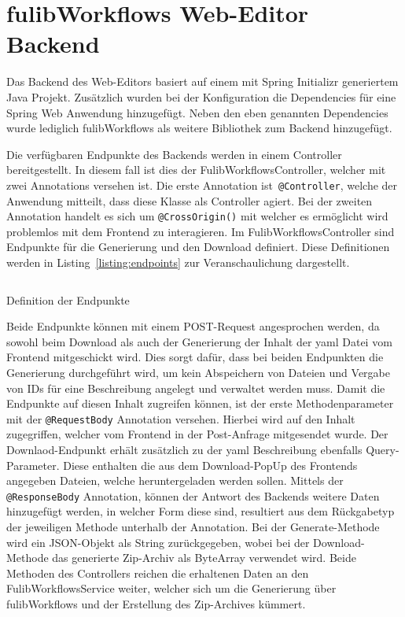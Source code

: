 \section{fulibWorkflows Web-Editor Backend}\label{sec:editor-backend}
Das Backend des Web-Editors basiert auf einem mit Spring Initializr generiertem Java Projekt.
Zusätzlich wurden bei der Konfiguration die Dependencies für eine Spring Web Anwendung hinzugefügt.
Neben den eben genannten Dependencies wurde lediglich fulibWorkflows als weitere Bibliothek zum Backend hinzugefügt.

Die verfügbaren Endpunkte des Backends werden in einem Controller bereitgestellt.
In diesem fall ist dies der FulibWorkflowsController, welcher mit zwei Annotations versehen ist.
Die erste Annotation ist~\texttt{@Controller}, welche der Anwendung mitteilt, dass diese Klasse als Controller agiert.
Bei der zweiten Annotation handelt es sich um \texttt{@CrossOrigin()} mit welcher es ermöglicht wird problemlos mit dem
Frontend zu interagieren.
Im FulibWorkflowsController sind Endpunkte für die Generierung und den Download definiert.
Diese Definitionen werden in Listing~\ref{listing:endpoints} zur Veranschaulichung dargestellt.

\begin{listing}[!ht]
    \inputminted[xleftmargin=20pt,linenos,firstnumber=15]{java}{listings/3.3/Endpoints.java}
    \caption{Definition der Endpunkte}
    \label{listing:endpoints}
\end{listing}

Beide Endpunkte können mit einem POST-Request angesprochen werden, da sowohl beim Download als auch der Generierung der Inhalt der
yaml Datei vom Frontend mitgeschickt wird.
Dies sorgt dafür, dass bei beiden Endpunkten die Generierung durchgeführt wird, um kein Abspeichern von Dateien und Vergabe von IDs für
eine Beschreibung angelegt und verwaltet werden muss.
Damit die Endpunkte auf diesen Inhalt zugreifen können, ist der erste Methodenparameter mit der \texttt{@RequestBody} Annotation versehen.
Hierbei wird auf den Inhalt zugegriffen, welcher vom Frontend in der Post-Anfrage mitgesendet wurde.
Der Downlaod-Endpunkt erhält zusätzlich zu der yaml Beschreibung ebenfalls Query-Parameter.
Diese enthalten die aus dem Download-PopUp des Frontends angegeben Dateien, welche heruntergeladen werden sollen.
Mittels der \texttt{@ResponseBody} Annotation, können der Antwort des Backends weitere Daten hinzugefügt werden, in welcher Form diese
sind, resultiert aus dem Rückgabetyp der jeweiligen Methode unterhalb der Annotation.
Bei der Generate-Methode wird ein JSON-Objekt als String zurückgegeben, wobei bei der Download-Methode das generierte Zip-Archiv als ByteArray verwendet wird.
Beide Methoden des Controllers reichen die erhaltenen Daten an den FulibWorkflowsService weiter, welcher sich um die Generierung über fulibWorkflows
und der Erstellung des Zip-Archives kümmert.

